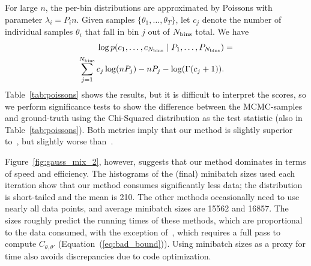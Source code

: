 \documentclass[twoside]{article} \usepackage{aistats2017}
\begin{document}
For large $n$, the per-bin distributions are approximated by Poissons with
parameter $\lambda_i=P_i n$. Given samples $\{\theta_1,\ldots,\theta_T\}$, let
$c_j$ denote the number of individual samples $\theta_i$ that fall in bin $j$
out of $N_{\rm bins}$ total. We have
\begin{equation}\label{eq:log_prob_poissons}
\begin{split}
    \log p(c_1, \ldots, c_{N_{\rm bins}} \mid P_1, \ldots, P_{N_{\rm bins}}) & =  \\
    \sum_{j=1}^{N_{\rm bins}} c_j \log (n P_j) - n P_j - \log(\Gamma(c_j+1)). & \\
\end{split}
\end{equation}
Table~\ref{tab:poissons} shows the results, but it is difficult to interpret the
scores, so we perform significance tests to show the difference between the
MCMC-samples and ground-truth using the Chi-Squared distribution as the test
statistic (also in Table~\ref{tab:poissons}). Both metrics imply that our method
is slightly superior to~\citet{cutting_mh_2014}, but slightly worse
than~\citet{icml2014c1_bardenet14}. 

Figure~\ref{fig:gauss_mix_2}, however, suggests that our method dominates in
terms of speed and efficiency. The histograms of the (final) minibatch sizes
used each iteration show that our method consumes significantly less data; the
distribution is short-tailed and the mean is 210. The other methods occasionally
need to use nearly all data points, and average minibatch sizes are 15562 and
16857. The sizes roughly predict the running times of these methods, which are
proportional to the data consumed, with the exception
of~\citet{icml2014c1_bardenet14}, which requires a full pass to compute
$C_{\theta,\theta'}$ (Equation~(\ref{eq:bad_bound})). Using minibatch sizes
as a proxy for time also avoids discrepancies due to code optimization.
\end{document}
